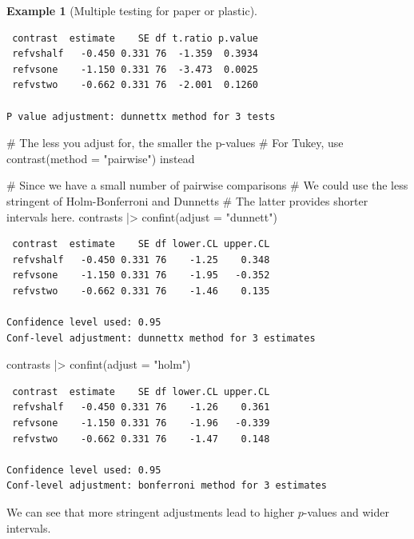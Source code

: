 \documentclass[
  11pt,
  letterpaper,
]{scrbook}
\newenvironment{Shaded}{\begin{snugshade}}{\end{snugshade}}
\newcommand{\AttributeTok}[1]{\textcolor[rgb]{0.40,0.45,0.13}{#1}}
\newcommand{\CommentTok}[1]{\textcolor[rgb]{0.37,0.37,0.37}{#1}}
\newcommand{\FunctionTok}[1]{\textcolor[rgb]{0.28,0.35,0.67}{#1}}
\newcommand{\NormalTok}[1]{\textcolor[rgb]{0.00,0.23,0.31}{#1}}
\newcommand{\SpecialCharTok}[1]{\textcolor[rgb]{0.37,0.37,0.37}{#1}}
\newcommand{\StringTok}[1]{\textcolor[rgb]{0.13,0.47,0.30}{#1}}
\theoremstyle{definition}
\newtheorem{example}{Example}[chapter]
\theoremstyle{remark}
\begin{document}
\begin{example}[Multiple testing for paper or
plastic]
\begin{verbatim}
 contrast  estimate    SE df t.ratio p.value
 refvshalf   -0.450 0.331 76  -1.359  0.3934
 refvsone    -1.150 0.331 76  -3.473  0.0025
 refvstwo    -0.662 0.331 76  -2.001  0.1260

P value adjustment: dunnettx method for 3 tests 
\end{verbatim}

\begin{Shaded}
\begin{Highlighting}[]
\CommentTok{\# The less you adjust for, the smaller the p{-}values}
\CommentTok{\# For Tukey, use \textquotesingle{}contrast(method = "pairwise")\textquotesingle{} instead}

\CommentTok{\# Since we have a small number of pairwise comparisons}
\CommentTok{\# We could use the less stringent of Holm{-}Bonferroni and Dunnett\textquotesingle{}s}
\CommentTok{\# The latter provides shorter intervals here.}
\NormalTok{contrasts }\SpecialCharTok{|\textgreater{}} \FunctionTok{confint}\NormalTok{(}\AttributeTok{adjust =} \StringTok{"dunnett"}\NormalTok{)}
\end{Highlighting}
\end{Shaded}

\begin{verbatim}
 contrast  estimate    SE df lower.CL upper.CL
 refvshalf   -0.450 0.331 76    -1.25    0.348
 refvsone    -1.150 0.331 76    -1.95   -0.352
 refvstwo    -0.662 0.331 76    -1.46    0.135

Confidence level used: 0.95 
Conf-level adjustment: dunnettx method for 3 estimates 
\end{verbatim}

\begin{Shaded}
\begin{Highlighting}[]
\NormalTok{contrasts }\SpecialCharTok{|\textgreater{}} \FunctionTok{confint}\NormalTok{(}\AttributeTok{adjust =} \StringTok{"holm"}\NormalTok{)}
\end{Highlighting}
\end{Shaded}

\begin{verbatim}
 contrast  estimate    SE df lower.CL upper.CL
 refvshalf   -0.450 0.331 76    -1.26    0.361
 refvsone    -1.150 0.331 76    -1.96   -0.339
 refvstwo    -0.662 0.331 76    -1.47    0.148

Confidence level used: 0.95 
Conf-level adjustment: bonferroni method for 3 estimates 
\end{verbatim}

We can see that more stringent adjustments lead to higher \(p\)-values
and wider intervals.

\end{example}
\end{document}
